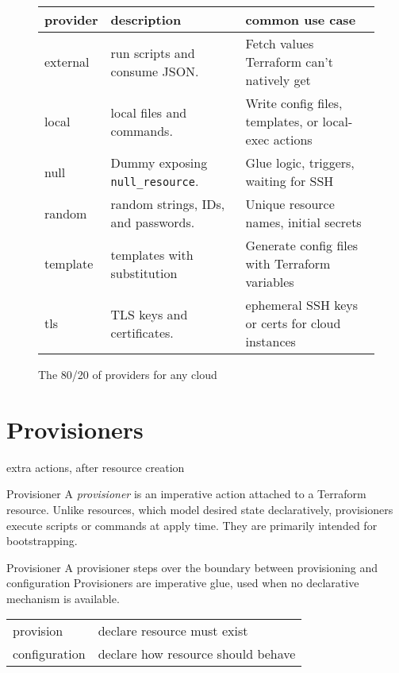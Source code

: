 \documentclass[openany, 12pt]{book}
\begin{document}
\begin{figure}[H]
	\begin{center}
		\begin{tabular}{lll}
			\toprule
			provider & description                             & common use case                                      \\
			\midrule
			external & run scripts and consume JSON.\@         & Fetch values Terraform can’t natively get            \\
			local    & local files and commands.               & Write config files, templates, or local-exec actions \\
			null     & Dummy exposing \texttt{null\_resource}. & Glue logic, triggers, waiting for SSH                \\
			random   & random strings, IDs, and passwords.     & Unique resource names, initial secrets               \\
			template & templates with substitution             & Generate config files with Terraform variables       \\
			tls      & TLS keys and certificates.              & ephemeral SSH keys or certs for cloud instances      \\
			\bottomrule
		\end{tabular}
	\end{center}
	\caption{The 80/20 of providers for any cloud}
\end{figure}

\chapter{Provisioners}
extra actions, after resource creation

\begin{definition}{Provisioner}{}
	A \emph{provisioner} is an imperative action attached to a Terraform
	resource. Unlike resources, which model desired state declaratively,
	provisioners execute scripts or commands at apply time. They are primarily
	intended for bootstrapping.
\end{definition}

\begin{intuition}{Provisioner}{}
	A provisioner steps over the boundary between provisioning and configuration
	Provisioners are imperative glue, used when no declarative mechanism is
	available.

	\begin{center}
		\begin{tabular}{ll}
			\toprule
			              &                                    \\
			\midrule
			provision     & declare resource must exist        \\
			configuration & declare how resource should behave \\
			\bottomrule
		\end{tabular}
	\end{center}
\end{intuition}
\end{document}
